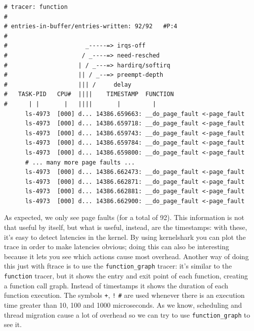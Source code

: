 \documentclass[10pt]{book}
\begin{document}
\begin{verbatim}
# tracer: function
#
# entries-in-buffer/entries-written: 92/92   #P:4
#
#                      _-----=> irqs-off
#                     / _----=> need-resched
#                    | / _---=> hardirq/softirq
#                    || / _--=> preempt-depth
#                    ||| /     delay
#   TASK-PID   CPU#  ||||    TIMESTAMP  FUNCTION
#      | |       |   ||||       |         |
      ls-4973  [000] d... 14386.659663: __do_page_fault <-page_fault
      ls-4973  [000] d... 14386.659718: __do_page_fault <-page_fault
      ls-4973  [000] d... 14386.659743: __do_page_fault <-page_fault
      ls-4973  [000] d... 14386.659784: __do_page_fault <-page_fault
      ls-4973  [000] d... 14386.659800: __do_page_fault <-page_fault
      # ... many more page faults ...
      ls-4973  [000] d... 14386.662473: __do_page_fault <-page_fault
      ls-4973  [000] d... 14386.662871: __do_page_fault <-page_fault
      ls-4973  [000] d... 14386.662881: __do_page_fault <-page_fault
      ls-4973  [000] d... 14386.662900: __do_page_fault <-page_fault

\end{verbatim}
As expected, we only see page faults (for a total of 92). This information is not that useful by itself, but what is useful, instead, are the timestamps: with these, it's easy to detect latencies in the kernel. By using kernelshark you can plot the trace in order to make latencies obvious; doing this can also be interesting because it lets you see which actions cause most overhead. Another way of doing this just with ftrace is to use the \verb|function_graph| tracer: it's similar to the \verb|function| tracer, but it shows the entry and exit point of each function, creating a function call graph. Instead of timestamps it shows the duration of each function execution. The symbols \verb|+|, \verb|!| \verb|#| are used whenever there is an execution time greater than 10, 100 and 1000 microseconds. As we know, scheduling and thread migration cause a lot of overhead so we can try to use \verb|function_graph| to see it.
\end{document}

